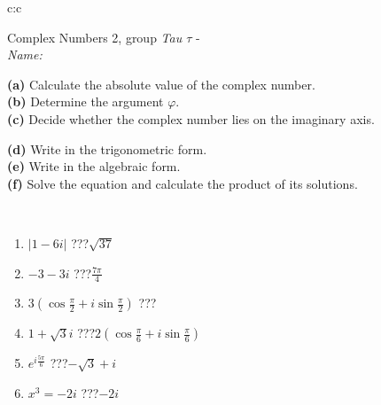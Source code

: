 \documentclass[10pt]{report}
\begin{document}
\newpage
\thispagestyle{empty}
\begin{tabular}{c:c}
\begin{minipage}[c][104.5mm][t]{0.5\linewidth}
\begin{center}
\vspace{5mm}
{\huge Complex Numbers 2, group \textit{Tau $\tau$} -}\\[5mm]
\textit{Name:}\phantom{xxxxxxxxxxxxxxxxxxxxxxxxxxxxxxxxxxxxxxxxxxxxxxxxxxxxxxxxxxxxxxxxx}\\[5mm]
\begin{minipage}{0.95\linewidth}
\begin{center}
{\small \begin{minipage}{0.44\textwidth} \raggedright
\textbf{(a)} Calculate the absolute value of the complex number. \\[1mm]
\textbf{(b)} Determine the argument \(\varphi\). \\[1mm]
\textbf{(c)} Decide whether the complex number lies on the imaginary axis. \end{minipage} \begin{minipage}{0.54\textwidth}
\textbf{(d)} Write in the trigonometric form. \\[1mm]
\textbf{(e)} Write in the algebraic form. \\[1mm]
\textbf{(f)} Solve the equation and calculate the product of its solutions.
\end{minipage}
}
\end{center}
\end{minipage}
\\[1mm]
\begin{minipage}{0.79\linewidth}
\begin{center}
\begin{varwidth}{\linewidth}
\setlength{\itemsep}{0pt}
\begin{enumerate}
\large
\item $|1-6i|$\quad \dotfill\; ???\;\dotfill \quad $\sqrt{37}$
\item $-3-3i$\quad \dotfill\; ???\;\dotfill \quad $\frac{7\pi}{4}$
\item $3\left(\cos{\frac{\pi}{2}}+i\sin{\frac{\pi}{2}}\right)$\quad \dotfill\; ???\;\dotfill \quad {}
\item $1+\sqrt{3}i$\quad \dotfill\; ???\;\dotfill \quad $2\left(\cos{\frac{\pi}{6}}+i\sin{\frac{\pi}{6}}\right)$
\item $e^{i\frac{5\pi}{6}}$\quad \dotfill\; ???\;\dotfill \quad $-\sqrt{3}+i$
\item $x^3=-2i$\quad \dotfill\; ???\;\dotfill \quad $-2i$

\end{enumerate}
\end{varwidth}
\end{center}
\end{minipage}
\end{center}
\end{minipage}
\end{tabular}
\end{document}
